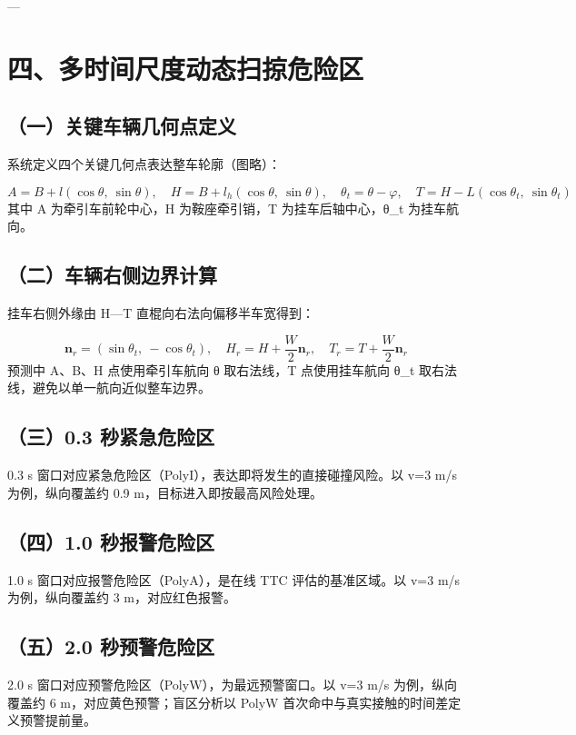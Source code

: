 \documentclass[UTF8,11pt]{ctexart}
\begin{document}
---

\section*{四、多时间尺度动态扫掠危险区}
\subsection*{（一）关键车辆几何点定义}
系统定义四个关键几何点表达整车轮廓（图略）：

\begin{equation}
A = B + l(\cos\theta,\ \sin\theta),\quad H = B + l_h(\cos\theta,\ \sin\theta),\quad \theta_t = \theta - \varphi,\quad T = H - L(\cos\theta_t,\ \sin\theta_t) 
\end{equation}
其中 A 为牵引车前轮中心，H 为鞍座牵引销，T 为挂车后轴中心，θ\_t 为挂车航向。

\subsection*{（二）车辆右侧边界计算}
挂车右侧外缘由 H—T 直棍向右法向偏移半车宽得到：

\begin{equation}
\boldsymbol{n}_r = (\sin\theta_t,\ -\cos\theta_t),\quad H_r = H + \frac{W}{2}\boldsymbol{n}_r,\quad T_r = T + \frac{W}{2}\boldsymbol{n}_r 
\end{equation}
预测中 A、B、H 点使用牵引车航向 θ 取右法线，T 点使用挂车航向 θ\_t 取右法线，避免以单一航向近似整车边界。

\subsection*{（三）0.3 秒紧急危险区}
0.3 s 窗口对应紧急危险区（PolyI），表达即将发生的直接碰撞风险。以 v=3 m/s 为例，纵向覆盖约 0.9 m，目标进入即按最高风险处理。

\subsection*{（四）1.0 秒报警危险区}
1.0 s 窗口对应报警危险区（PolyA），是在线 TTC 评估的基准区域。以 v=3 m/s 为例，纵向覆盖约 3 m，对应红色报警。

\subsection*{（五）2.0 秒预警危险区}
2.0 s 窗口对应预警危险区（PolyW），为最远预警窗口。以 v=3 m/s 为例，纵向覆盖约 6 m，对应黄色预警；盲区分析以 PolyW 首次命中与真实接触的时间差定义预警提前量。
\end{document}
